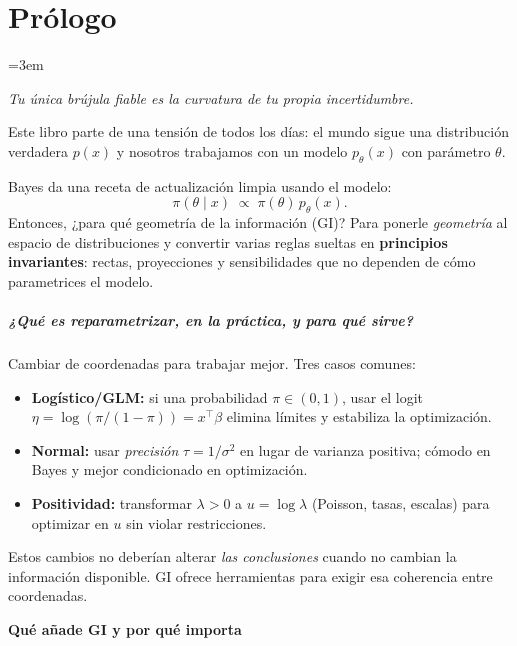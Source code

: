 \chapter*{Prólogo}

\begingroup
\setlength{\parindent}{0pt}
\setlength{\parskip}{6pt}
\emergencystretch=3em
\sloppy

\begin{flushright}
	\emph{\guillemotleft Tu única brújula fiable es la curvatura de tu propia incertidumbre.\guillemotright}
\end{flushright}

Este libro parte de una tensión de todos los días: el mundo sigue una distribución verdadera $p(x)$ y nosotros trabajamos con un modelo $p_\theta(x)$ con parámetro $\theta$.

Bayes da una receta de actualización limpia usando el modelo:
\[
\pi(\theta\mid x)\;\propto\;\pi(\theta)\,p_\theta(x).
\]
Entonces, ¿para qué geometría de la información (GI)? Para ponerle \emph{geometría} al espacio de distribuciones y convertir varias reglas sueltas en \textbf{principios invariantes}: rectas, proyecciones y sensibilidades que no dependen de cómo parametrices el modelo.

\paragraph{¿Qué es reparametrizar, en la práctica, y para qué sirve?}
Cambiar de coordenadas para trabajar mejor. Tres casos comunes:
\begin{itemize}
	\item \textbf{Logístico/GLM:} si una probabilidad $\pi\in(0,1)$, usar el logit $\eta=\log(\pi/(1-\pi))=x^{\top}\beta$ elimina límites y estabiliza la optimización.
	\item \textbf{Normal:} usar \emph{precisión} $\tau=1/\sigma^2$ en lugar de varianza positiva; cómodo en Bayes y mejor condicionado en optimización.
	\item \textbf{Positividad:} transformar $\lambda>0$ a $u=\log\lambda$ (Poisson, tasas, escalas) para optimizar en $u$ sin violar restricciones.
\end{itemize}
Estos cambios no deberían alterar \emph{las conclusiones} cuando no cambian la información disponible. GI ofrece herramientas para exigir esa coherencia entre coordenadas.

\textbf{Qué añade GI y por qué importa}

